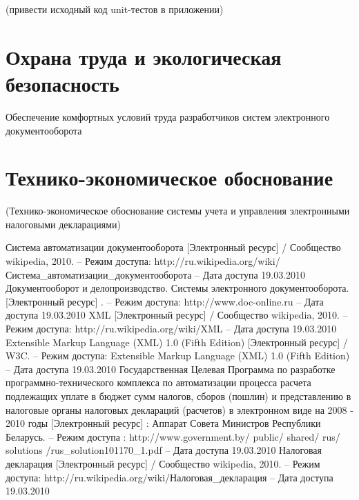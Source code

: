 \documentclass[14pt,a4paper]{reportmod}
\begin{document}
(привести исходный код unit-тестов в приложении)

\chapter*{Охрана труда и экологическая безопасность}
Обеспечение комфортных условий труда разработчиков систем электронного документооборота


\chapter*{Технико-экономическое обоснование}
(Технико-экономическое обоснование системы учета и управления электронными налоговыми декларациями)


\begin{thebibliography}{99}

 Система автоматизации документооборота [Электронный ресурс] / Сообщество wikipedia, 2010. -- Режим доступа: http://ru.wikipedia.org/wiki/Система\_автоматизации\_документооборота -- Дата доступа 19.03.2010
 Документооборот и делопроизводство. Системы электронного документооборота. [Электронный ресурс] . -- Режим доступа: http://www.doc-online.ru -- Дата доступа 19.03.2010
 XML [Электронный ресурс] / Сообщество wikipedia, 2010. -- Режим доступа: http://ru.wikipedia.org/wiki/XML -- Дата доступа 19.03.2010
 Extensible Markup Language (XML) 1.0 (Fifth Edition) [Электронный ресурс] / W3C. -- Режим доступа: Extensible Markup Language (XML) 1.0 (Fifth Edition) -- Дата доступа 19.03.2010
 Государственная Целевая Программа по разработке программно-технического комплекса по автоматизации процесса расчета подлежащих уплате в бюджет сумм налогов, сборов (пошлин) и представлению в налоговые органы налоговых деклараций (расчетов) в электронном виде на 2008 - 2010 годы [Электронный ресурс] : Аппарат Совета Министров Республики Беларусь. -- Режим доступа : http://www.government.by/ public/ shared/ rus/ solutions /rus\_solution101170\_1.pdf -- Дата доступа 19.03.2010
 Налоговая декларация [Электронный ресурс] / Сообщество wikipedia, 2010. -- Режим доступа: http://ru.wikipedia.org/wiki/Налоговая\_декларация -- Дата доступа 19.03.2010

\end{thebibliography}
\end{document}
